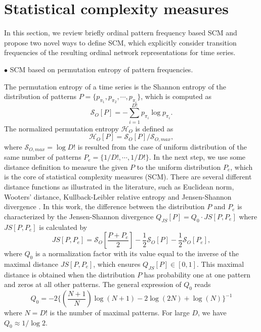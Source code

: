\documentclass[12pt,aip,cha,reprint,nofootinbib]{revtex4-1}
\begin{document}
\section{Statistical complexity measures} \label{sec:SCM}
In this section, we review briefly ordinal pattern frequency based SCM and propose two novel ways to define SCM, which explicitly consider transition frequencies of the resulting ordinal network representations for time series. 
 
$\bullet$ SCM based on permutation entropy of pattern frequencies. 

The permutation entropy of a time series is the Shannon entropy of the distribution of patterns $P = \{p_{\pi_1}, p_{\pi_2}, \cdots, p_{\pi_i} \}$, which is computed as
\begin{equation}
\mathcal{S}_{O}[P]= - \sum_{i=1}^{D!} p_{\pi_i} \log p_{\pi_i}. 
\end{equation}
The normalized permutation entropy $\mathcal{H}_O$ is defined as 
\begin{equation} \label{eq:Ho}
\mathcal{H}_{O}[P] = \mathcal{S}_{O}[P] / \mathcal{S}_{O, max}, 
\end{equation}
where $\mathcal{S}_{O, max} = \log D!$ is resulted from the case of uniform distribution of the same number of patterns $P_e = \{1/D!, \cdots, 1/D!\}$.  In the next step, we use some distance definition to measure the given $P$ to the uniform distribution $P_e$, which is the core of statistical complexity measures (SCM).  There are several different distance functions as illustrated in the literature, such as Euclidean norm, Wooters' distance, Kullback-Leibler relative entropy and Jensen-Shannon divergence \cite{kowalskiEntropy2011}. In this work, the difference between the distribution $P$ and $P_e$ is characterized by the Jensen-Shannon divergence $Q_{JS}[P] = Q_0 \cdot JS[P, P_e]$ where $JS[P, P_e]$ is calculated by 
\begin{equation}
JS[P, P_e] = \mathcal{S}_O[\frac{P+P_e}{2}] - \frac{1}{2}\mathcal{S}_O[P] - \frac{1}{2}\mathcal{S}_O[P_e], 
\end{equation}
where $Q_0$ is a normalization factor with its value equal to the inverse of the maximal distance $JS[P, P_e]$, which ensures $Q_{JS}[P] \in [0, 1]$. This maximal distance is obtained when the distribution $P$ has probability one at one pattern and zeros at all other patterns. The general expression of $Q_0$ reads  
\begin{equation} \label{eq:Q0}
Q_0 = -2 \{(\frac{N+1}{N}) \log (N+1) -2 \log (2N) + \log (N)  \}^{-1}
\end{equation}
where $N = D!$ is the number of maximal patterns. For large $D$, we have $Q_0 \approx 1 /  \log 2$. 
\end{document}
